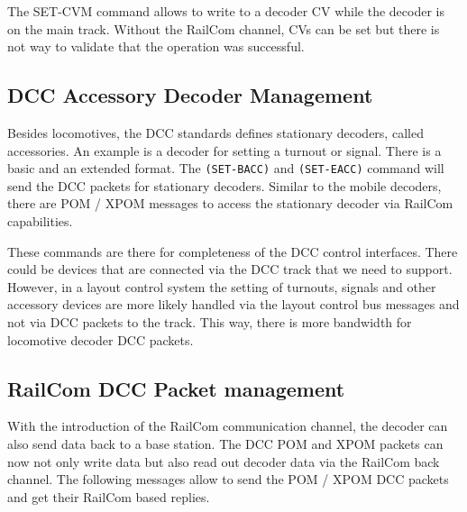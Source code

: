 The SET-CVM command allows to write to a decoder CV while the decoder is on the main track. Without the RailCom channel, CVs can be set but there is not way to validate that the operation was successful.

\subsection{DCC Accessory Decoder Management}

Besides locomotives, the DCC standards defines stationary decoders, called accessories. An example is a decoder for setting a turnout or signal. There is a basic and an extended format. The \texttt{(SET-BACC)} and \texttt{(SET-EACC)} command will send the DCC packets for stationary decoders. Similar to the mobile decoders, there are POM / XPOM messages to access the stationary decoder via RailCom capabilities.

\begin{table}[ht!]
    \centering 
    \caption{DCC Accessory Decoder Management}
\end{table}

These commands are there for completeness of the DCC control interfaces. There could be devices that are connected via the DCC track that we need to support. However, in a layout control system the setting of turnouts, signals and other accessory devices are more likely handled via the layout control bus messages and not via DCC packets to the track. This way, there is more bandwidth for locomotive decoder DCC packets.

\subsection{RailCom DCC Packet management}

With the introduction of the RailCom communication channel, the decoder can also send data back to a base station. The DCC POM and XPOM packets can now not only write data but also read out decoder data via the RailCom back channel. The following messages allow to send the POM / XPOM DCC packets and get their RailCom based replies.

